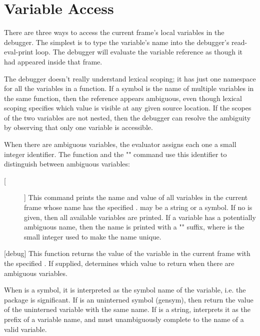 \section{Variable Access}
\label{debug-vars}

There are three ways to access the current frame's local variables in the
debugger.  The simplest is to type the variable's name into the debugger's
read-eval-print loop.  The debugger will evaluate the variable reference as
though it had appeared inside that frame.

The debugger doesn't really understand lexical scoping; it has just one
namespace for all the variables in a function.  If a symbol is the name of
multiple variables in the same function, then the reference appears ambiguous,
even though lexical scoping specifies which value is visible at any given
source location.  If the scopes of the two variables are not nested, then the
debugger can resolve the ambiguity by observing that only one variable is
accessible.

When there are ambiguous variables, the evaluator assigns each one a small
integer identifier.  The  function and the "" command use
this identifier to distinguish between ambiguous variables:
\begin{description}

\item[ []]
This command prints the name and value of all variables in the current frame
whose name has the specified .   may be a string or a
symbol.  If no  is given, then all available variables are printed.
If a variable has a potentially ambiguous name, then the name is printed with a
"\code{#}" suffix, where  is the small integer used to
make the name unique.
\end{description}

[debug]{}
This function returns the value of the variable in the current frame with the
specified .  If supplied,  determines which value to
return when there are ambiguous variables.

When  is a symbol, it is interpreted as the symbol name of the
variable, i.e. the package is significant.  If  is an uninterned symbol
(gensym), then return the value of the uninterned variable with the same name.
If  is a string,  interprets it as the prefix of a
variable name, and must unambiguously complete to the name of a valid variable.

